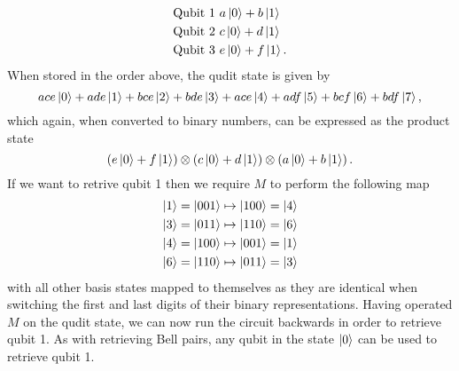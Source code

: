 \begin{align*}
    \text{Qubit 1 } &a\ket{0} + b\ket{1}\\
    \text{Qubit 2 } &c\ket{0} + d\ket{1}\\
    \text{Qubit 3 } &e\ket{0} + f\ket{1}.
\end{align*}
When stored in the order above, the qudit state is given by
\begin{equation}
    ace\ket{0} + ade\ket{1} + bce\ket{2} + bde\ket{3} + ace\ket{4} + adf\ket{5} + bcf\ket{6} + bdf\ket{7},
\end{equation}
which again, when converted to binary numbers, can be expressed as the product state
\begin{equation}
    \left(e\ket{0} + f\ket{1}\right) \otimes \left(c\ket{0} + d\ket{1}\right) \otimes \left(a\ket{0} + b\ket{1}\right).
\end{equation}
If we want to retrive qubit 1 then we require $M$ to perform the following map
\begin{align}
    \ket{1} = \ket{001} &\mapsto \ket{100} = \ket{4}\\
    \ket{3} = \ket{011} &\mapsto \ket{110} = \ket{6}\\
    \ket{4} = \ket{100} &\mapsto \ket{001} = \ket{1}\\
    \ket{6} = \ket{110} &\mapsto \ket{011} = \ket{3}
\end{align}
with all other basis states mapped to themselves as they are identical when switching the first and last digits of their binary representations. Having operated $M$ on the qudit state, we can now run the circuit backwards in order to retrieve qubit 1. As with retrieving Bell pairs, any qubit in the state $\ket{0}$ can be used to retrieve qubit 1.